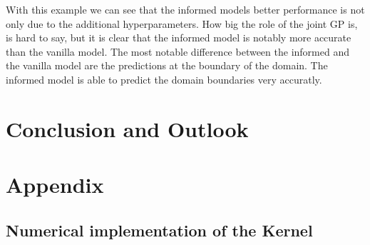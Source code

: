 \documentclass{article}
\begin{document}
With this example we can see that the informed models better performance is not only due to the additional hyperparameters. How big the role of the joint GP is, is hard to say, but it is clear that the informed model is notably more accurate than the vanilla model. The most notable difference between the informed and the vanilla model are the predictions at the boundary of the domain. The informed model is able to predict the domain boundaries very accuratly.  \\
\section{Conclusion and Outlook}

\section{Appendix}
\subsection{Numerical implementation of the Kernel}




\end{document}
